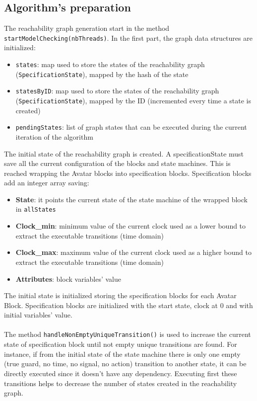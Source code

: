 \documentclass[12pt]{article}
\begin{document}
\subsection{Algorithm's preparation}
\label{sec:am_prep}
The reachability graph generation start in the method \texttt{startModelChecking(nbThreads)}. In the first part, the graph data structures are initialized:
\begin{itemize}
\item \texttt{states}: map used to store the states of the reachability graph (\texttt{SpecificationState}), mapped by the hash of the state
\item \texttt{statesByID}: map used to store the states of the reachability graph (\texttt{SpecificationState}), mapped by the ID (incremented every time a state is created)
\item \texttt{pendingStates}: list of graph states that can be executed during the current iteration of the algorithm
\end{itemize}
The initial state of the reachability graph is created. A specificationState must save all the current configuration of the blocks and state machines. This is reached wrapping the Avatar blocks into specification blocks. Specification blocks add an integer array saving:
\begin{itemize}
\item \textbf{State}: it points the current state of the state machine of the wrapped block in \texttt{allStates}
\item \textbf{Clock\_min}: minimum value of the current clock used as a lower bound to extract the executable transitions (time domain)
\item \textbf{Clock\_max}: maximum value of the current clock used as a higher bound to extract the executable transitions (time domain)
\item \textbf{Attributes}: block variables' value
\end{itemize}
The initial state is initialized storing the specification blocks for each Avatar Block. Specification blocks are initialized with the start state, clock at 0 and with initial variables' value.
\\\\
The method \texttt{handleNonEmptyUniqueTransition()} is used to increase the current state of specification block until not empty unique transitions are found. For instance, if from the initial state of the state machine there is only one empty (true guard, no time, no signal, no action) transition to another state, it can be directly executed since it doesn't have any dependency. Executing first these transitions helps to decrease the number of states created in the reachability graph.
\end{document}
